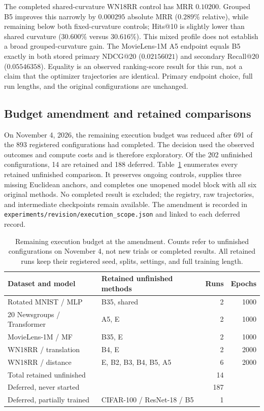The completed shared-curvature WN18RR control has MRR $0.10200$. Grouped B5 improves this narrowly by $0.000295$ absolute MRR ($0.289\%$ relative), while remaining below both fixed-curvature controls; Hits@10 is slightly lower than shared curvature ($30.600\%$ versus $30.616\%$). This mixed profile does not establish a broad grouped-curvature gain. The MovieLens-1M A5 endpoint equals B5 exactly in both stored primary NDCG@20 ($0.02156021$) and secondary Recall@20 ($0.05546358$). Equality is an observed ranking-score result for this run, not a claim that the optimizer trajectories are identical. Primary endpoint choice, full run lengths, and the original configurations are unchanged.




\FloatBarrier

\subsection{Budget amendment and retained comparisons}
\label{app:scope-amendment}
On November 4, 2026, the remaining execution budget was reduced after 691 of the 893 registered configurations had completed. The decision used the observed outcomes and compute costs and is therefore exploratory. Of the 202 unfinished configurations, 14 are retained and 188 deferred. Table~\ref{tab:scope-amendment} enumerates every retained unfinished comparison. It preserves ongoing controls, supplies three missing Euclidean anchors, and completes one unopened model block with all six original methods. No completed result is excluded; the registry, raw trajectories, and intermediate checkpoints remain available. The amendment is recorded in \texttt{experiments/revision/execution\_scope.json} and linked to each deferred record.

\begin{table}[!htbp]
\centering
\caption{Remaining execution budget at the amendment. Counts refer to unfinished configurations on November 4, not new trials or completed results. All retained runs keep their registered seed, splits, settings, and full training length.}
\label{tab:scope-amendment}
\footnotesize\setlength{\tabcolsep}{5pt}\renewcommand{\arraystretch}{1.12}
\begin{tabular}{llrr}
\toprule
Dataset and model & Retained unfinished methods & Runs & Epochs \\
\midrule
Rotated MNIST / MLP & B35, shared & 2 & 1000 \\
20 Newsgroups / Transformer & A5, E & 2 & 1000 \\
MovieLens-1M / MF & B35, E & 2 & 1000 \\
WN18RR / translation & B4, E & 2 & 2000 \\
WN18RR / distance & E, B2, B3, B4, B5, A5 & 6 & 2000 \\
\midrule
Total retained unfinished & & 14 & \\
Deferred, never started & & 187 & \\
Deferred, partially trained & CIFAR-100 / ResNet-18 / B5 & 1 & \\
\bottomrule
\end{tabular}
\end{table}

